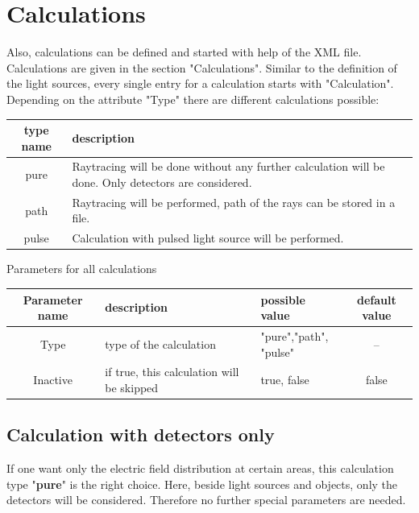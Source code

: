 \documentclass[a4paper,html,11pt,openany]{book}
\begin{document}
 \chapter {Calculations}
 Also, calculations can be defined and started with help of the XML file. Calculations are given in the section "Calculations". Similar to the definition of the light sources, every single entry for a calculation starts with "Calculation". Depending on the attribute "Type" there are different calculations possible:
 
 \vspace{1em}
 \begin{tabular}{c|m{8cm}}
 type name & description \\
 \hline
 pure & Raytracing will be done without any further calculation will be done. Only detectors are considered.\\
 \hline 
 path & Raytracing will be performed, path of the rays can be stored in a file. \\
  \hline
 pulse & Calculation with pulsed light source will be performed.
 \end{tabular}
 
 \vspace{1em}

 Parameters for all calculations
 \begin{table}[h!]
\fontsize{10pt}{10pt}\selectfont
 \begin{tabular}{c|m{3cm}|m{3cm}|c}
  Parameter name & description  & possible value & default value \\
 \hline
 Type & type of the calculation & \parbox{3cm}{"pure","path",\\"pulse"} & -- \\
 \hline
 Inactive & if true, this calculation will be skipped & true, false & false \\
 \hline 
 \end{tabular}
 \end{table}

\section{Calculation with detectors only}
If one want only the electric field distribution at certain areas, this calculation type "\textbf{pure}" is the right choice. Here, beside light sources and objects, only the detectors will be considered. Therefore no further special parameters are needed. 
\end{document}

